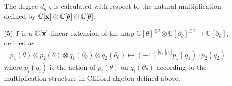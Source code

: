 \documentclass[reqno,12pt]{amsart}
\numberwithin{equation}{section}
\theoremstyle{plain}
\theoremstyle{definition}
\newcommand{\CC}{{\mathbb{C}}}
\newcommand{\bx}{{\bf x}}
\begin{document}
\begin{itemize}
\begin{itemize}
The degree $d_{g,h}$ is calculated with respect to the natural multiplication defined by $\CC[\bx]\otimes \CC[\theta] \otimes \CC[\theta]$;
\item[(5)]
$\Upsilon$ is a $\CC[\bx]$-linear extension of the map $\CC[{\theta}]^{\otimes2}\otimes \CC[\partial_{\theta}]^{\otimes2}\to\CC[\partial_{\theta}]$, defined as
\begin{align*}
 p_1(\theta)\otimes p_2(\theta)\otimes q_1(\partial_\theta)\otimes q_2(\partial_\theta)\mapsto(-1)^{|q_1||p_2|}p_1(q_1)\cdot p_2(q_2)
\end{align*}
where $p_i(q_i)$ is the action of $p_i(\theta)$ on $q_i(\partial_\theta)$ according to the multiplication structure in Clifford algebra defined above. 
\end{itemize}
\end{itemize}
\end{document}
